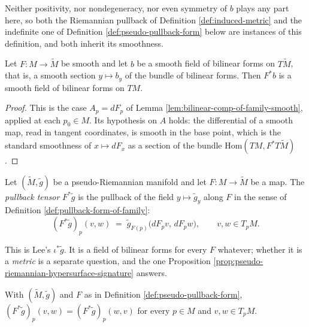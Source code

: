 Neither positivity, nor nondegeneracy, nor even symmetry of $b$ plays any part here, so both the Riemannian pullback of Definition \ref{def:induced-metric} and the indefinite one of Definition \ref{def:pseudo-pullback-form} below are instances of this definition, and both inherit its smoothness.

\begin{lemma}
\label{lem:pullback-form-of-family-smooth}
\leanok
{}
Let $F : M \to \tilde{M}$ be smooth and let $b$ be a smooth field of bilinear forms on $T\tilde{M}$, that is, a smooth section $y \mapsto b_y$ of the bundle of bilinear forms. Then $F^*b$ is a smooth field of bilinear forms on $TM$.
\end{lemma}

\begin{proof}
\leanok
{}
This is the case $A_p = dF_p$ of Lemma \ref{lem:bilinear-comp-of-family-smooth}, applied at each $p_0 \in M$. Its hypothesis on $A$ holds: the differential of a smooth map, read in tangent coordinates, is smooth in the base point, which is the standard smoothness of $x \mapsto dF_x$ as a section of the bundle $\mathrm{Hom}(TM, F^*T\tilde{M})$.
\end{proof}

\begin{definition}
\label{def:pseudo-pullback-form}
\leanok
{}
Let $(\tilde{M},\tilde{g})$ be a pseudo-Riemannian manifold and let $F : M \to \tilde{M}$ be a map. The \emph{pullback tensor} $F^*\tilde{g}$ is the pullback of the field $y \mapsto \tilde{g}_y$ along $F$ in the sense of Definition \ref{def:pullback-form-of-family}:
\[
  (F^*\tilde{g})_p(v,w) \;=\; \tilde{g}_{F(p)}\bigl(dF_p v,\, dF_p w\bigr), \qquad v,w \in T_pM .
\]
\end{definition}

This is Lee's $\iota^*\tilde{g}$. It is a field of bilinear forms for every $F$ whatever; whether it is a \emph{metric} is a separate question, and the one Proposition \ref{prop:pseudo-riemannian-hypersurface-signature} answers.

\begin{lemma}
\label{lem:pseudo-pullback-form-symm}
\leanok
{}
With $(\tilde{M},\tilde{g})$ and $F$ as in Definition \ref{def:pseudo-pullback-form}, $(F^*\tilde{g})_p(v,w) = (F^*\tilde{g})_p(w,v)$ for every $p \in M$ and $v,w \in T_pM$.
\end{lemma}

